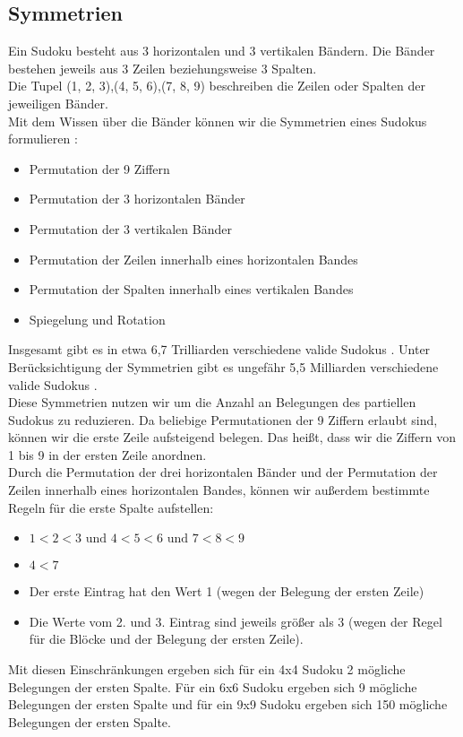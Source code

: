 \documentclass[12pt,a4paper]{article}
\begin{document}
\subsection{Symmetrien}
Ein Sudoku besteht aus 3 horizontalen und 3 vertikalen Bändern. Die Bänder bestehen jeweils aus 3 Zeilen beziehungsweise 3 Spalten. \\
Die Tupel (1, 2, 3),(4, 5, 6),(7, 8, 9) beschreiben die Zeilen oder Spalten der jeweiligen Bänder. \\
Mit dem Wissen über die Bänder können wir die Symmetrien eines Sudokus formulieren \cite{russell2006mathematics}: \\
\begin{itemize}
    \item Permutation der 9 Ziffern
    \item Permutation der 3 horizontalen Bänder
    \item Permutation der 3 vertikalen Bänder
    \item Permutation der Zeilen innerhalb eines horizontalen Bandes
    \item Permutation der Spalten innerhalb eines vertikalen Bandes
    \item Spiegelung und Rotation
\end{itemize}
Insgesamt gibt es in etwa 6,7 Trilliarden verschiedene valide Sudokus \cite{felgenhauer2006mathematics}. Unter Berücksichtigung der Symmetrien
gibt es ungefähr 5,5 Milliarden verschiedene valide Sudokus \cite{russell2006mathematics}. \\
Diese Symmetrien nutzen wir um die Anzahl an Belegungen des partiellen Sudokus zu reduzieren. Da beliebige Permutationen der 9 Ziffern  erlaubt sind,
können wir die erste Zeile aufsteigend belegen. Das heißt, dass wir die Ziffern von 1 bis 9 in der ersten Zeile anordnen. \\
Durch die Permutation der drei horizontalen Bänder und der Permutation der Zeilen innerhalb eines horizontalen Bandes, können wir außerdem bestimmte Regeln für die erste Spalte aufstellen:
\begin{itemize}
    \item $1< 2< 3 \text{ und } 4<5<6 \text{ und } 7<8<9$
    \item $4 < 7$
    \item Der erste Eintrag hat den Wert 1 (wegen der Belegung der ersten Zeile)
    \item Die Werte vom 2. und 3. Eintrag sind jeweils größer als 3 (wegen der Regel für die Blöcke und der Belegung der ersten Zeile).
\end{itemize}
Mit diesen Einschränkungen ergeben sich für ein 4x4 Sudoku 2 mögliche Belegungen der ersten Spalte. Für ein 6x6 Sudoku ergeben sich 9 mögliche
Belegungen der ersten Spalte und für ein 9x9 Sudoku ergeben sich 150 mögliche Belegungen der ersten Spalte. \\
\end{document}
